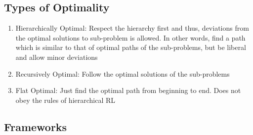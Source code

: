 \subsection{Types of Optimality}
\begin{enumerate}
\item Hierarchically Optimal: Respect the hierarchy first and thus, deviations from the optimal solutions to sub-problem is allowed. In other words, find a path which is similar to that of optimal paths of the sub-problems, but be liberal and allow minor deviations

\item Recursively Optimal: Follow the optimal solutions of the sub-problems 

\item Flat Optimal: Just find the optimal path from beginning to end. Does not obey the rules of hierarchical RL
\end{enumerate}



\subsection{Frameworks}
